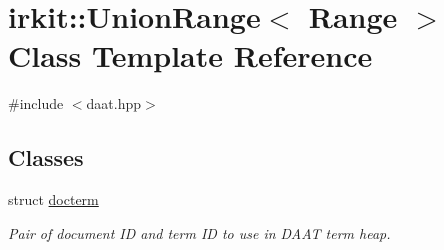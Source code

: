\hypertarget{classirkit_1_1UnionRange}{}\section{irkit\+:\+:Union\+Range$<$ Range $>$ Class Template Reference}
\label{classirkit_1_1UnionRange}


{\ttfamily \#include $<$daat.\+hpp$>$}

\subsection*{Classes}
\begin{DoxyCompactItemize}
\item 
struct \mbox{\hyperlink{structirkit_1_1UnionRange_1_1docterm}{docterm}}
\begin{DoxyCompactList}\small\item\em Pair of document ID and term ID to use in D\+A\+AT term heap. \end{DoxyCompactList}\end{DoxyCompactItemize}
